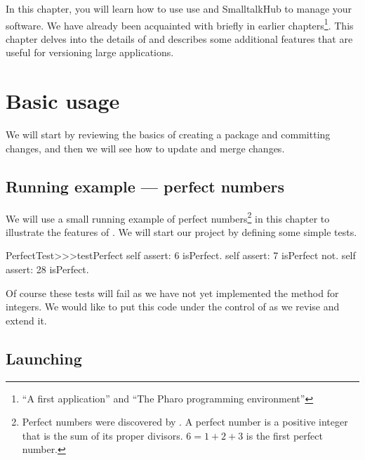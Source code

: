 \documentclass[a4paper,10pt,twoside]{book}
\begin{document}
In this chapter, you will learn how to use use \Mont and SmalltalkHub to manage your software. We have already been acquainted with \Mont briefly in earlier chapters\footnote{``A first application'' and ``The Pharo programming environment''}.
This chapter delves into the details of \Mont{} and describes some additional features that are useful for versioning large applications.

\section{Basic usage}

We will start by reviewing the basics of creating a package and committing changes, and then we will see how to update and merge changes. 

\subsection{Running example --- perfect numbers}

We will use a small running example of perfect numbers\footnote{Perfect numbers were discovered by . A perfect number is a positive integer that is the sum of its proper divisors. $6 = 1 + 2 + 3$ is the first perfect number.} in this chapter to illustrate the features of \Mont. We will start our project by defining some simple tests.

\begin{code}{}
PerfectTest>>>testPerfect
	self assert: 6 isPerfect.
	self assert: 7 isPerfect not.
	self assert: 28 isPerfect.
\end{code}

Of course these tests will fail as we have not yet implemented the  method for integers. We would like to put this code under the control of \Mont as we revise and extend it.

\subsection{Launching \Mont}
\end{document}
